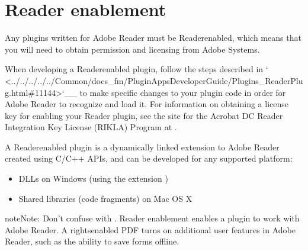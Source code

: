 \documentclass[letterpaper,12pt,english,openany,oneside]{sphinxmanual}
\begin{document}
\section{Reader enablement}
\label{\detokenize{Reader_Plugins:reader-enablement}}
Any plugins written for Adobe Reader must be Reader\sphinxhyphen{}enabled, which means that you will need to obtain permission and licensing from Adobe Systems.

When developing a Reader\sphinxhyphen{}enabled plugin, follow the steps described in ` <../../../../../Common/docs\_fm/PluginAppsDeveloperGuide/Plugins\_ReaderPlug.html\#11144>`\_\_ to make specific changes to your plugin code in order for Adobe Reader to recognize and load it. For information on obtaining a license key for enabling your Reader plugin, see the site for the Acrobat DC Reader Integration Key License (RIKLA) Program at .

A Reader\sphinxhyphen{}enabled plugin is a dynamically linked extension to Adobe Reader created using C/C++ APIs, and can be developed for any supported platform:
\begin{itemize}
\item {} 
DLLs on Windows (using the extension  )

\item {} 
Shared libraries (code fragments) on Mac OS X

\end{itemize}

\begin{sphinxadmonition}{note}{Note:}
Don’t confuse  with . Reader enablement enables a plugin to work with Adobe Reader. A rights\sphinxhyphen{}enabled PDF turns on additional user features in Adobe Reader, such as the ability to save forms offline.
\end{sphinxadmonition}
\end{document}
